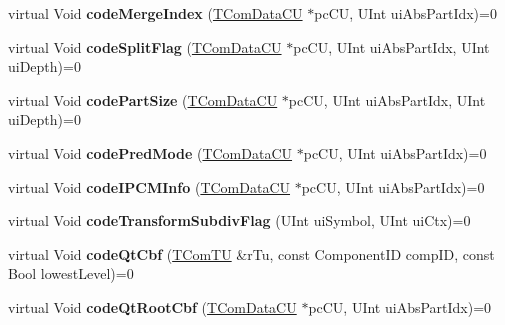 \begin{DoxyCompactItemize}
virtual Void {\bfseries code\+Merge\+Index} (\hyperlink{class_t_com_data_c_u}{T\+Com\+Data\+CU} $\ast$pc\+CU, U\+Int ui\+Abs\+Part\+Idx)=0
\item 
\mbox{\label{class_t_enc_entropy_if_abcd76e294c0ebeefe21016d7bd8e830f}} 
virtual Void {\bfseries code\+Split\+Flag} (\hyperlink{class_t_com_data_c_u}{T\+Com\+Data\+CU} $\ast$pc\+CU, U\+Int ui\+Abs\+Part\+Idx, U\+Int ui\+Depth)=0
\item 
\mbox{\label{class_t_enc_entropy_if_a3e6fed1ed0c4133aec520f5b94df4420}} 
virtual Void {\bfseries code\+Part\+Size} (\hyperlink{class_t_com_data_c_u}{T\+Com\+Data\+CU} $\ast$pc\+CU, U\+Int ui\+Abs\+Part\+Idx, U\+Int ui\+Depth)=0
\item 
\mbox{\label{class_t_enc_entropy_if_a375317046730a1c66f66873b8514a0af}} 
virtual Void {\bfseries code\+Pred\+Mode} (\hyperlink{class_t_com_data_c_u}{T\+Com\+Data\+CU} $\ast$pc\+CU, U\+Int ui\+Abs\+Part\+Idx)=0
\item 
\mbox{\label{class_t_enc_entropy_if_a81b334d3b20b90f738362fe525f25df1}} 
virtual Void {\bfseries code\+I\+P\+C\+M\+Info} (\hyperlink{class_t_com_data_c_u}{T\+Com\+Data\+CU} $\ast$pc\+CU, U\+Int ui\+Abs\+Part\+Idx)=0
\item 
\mbox{\label{class_t_enc_entropy_if_af2127065888b4759fd9ba993c7d3c27f}} 
virtual Void {\bfseries code\+Transform\+Subdiv\+Flag} (U\+Int ui\+Symbol, U\+Int ui\+Ctx)=0
\item 
\mbox{\label{class_t_enc_entropy_if_a86b4fb6aca4332baa3fec4d8ac30c1cf}} 
virtual Void {\bfseries code\+Qt\+Cbf} (\hyperlink{class_t_com_t_u}{T\+Com\+TU} \&r\+Tu, const Component\+ID comp\+ID, const Bool lowest\+Level)=0
\item 
\mbox{\label{class_t_enc_entropy_if_a1ea43a39bc716b4504e178a8498aa940}} 
virtual Void {\bfseries code\+Qt\+Root\+Cbf} (\hyperlink{class_t_com_data_c_u}{T\+Com\+Data\+CU} $\ast$pc\+CU, U\+Int ui\+Abs\+Part\+Idx)=0
\item 
\mbox{\label{class_t_enc_entropy_if_ad4e67ddf14ffc2340dbc89a0afe11154}} 

\end{DoxyCompactItemize}
